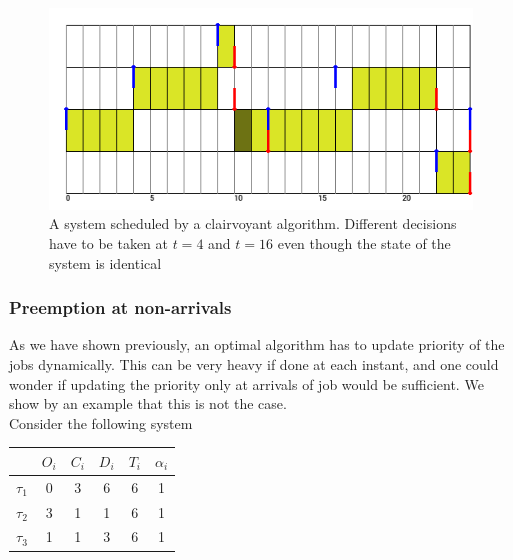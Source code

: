 \documentclass[a4paper,10pt]{article}
\begin{document}
        \begin{figure}[H]
        \begin{center}
            \includegraphics[scale=0.7]{figs/clairvoyance_example.png}
            \caption{A system scheduled by a clairvoyant algorithm. Different decisions have to be taken at $t=4$ and $t=16$ even though the state of the system is identical}
            \label{fig:clairvoyance}
        \end{center}
        \end{figure}


        \subsubsection{Preemption at non-arrivals}

        As we have shown previously, an optimal algorithm has to update priority of the jobs dynamically. This can be very heavy if done at each instant, and one could wonder if updating the priority only at arrivals of job would be sufficient. We show by an example that this is not the case.\\

        Consider the following system

        \begin{center}
            \begin{tabular}{|r|c|c|c|c|c|}
                \hline
                            & $O_i$ & $C_i$ & $D_i$ & $T_i$ & $\alpha_i$ \\ \hline
                $\tau_1$    & 0     & 3     & 6    & 6     & 1     \\ \hline
                $\tau_2$    & 3     & 1     & 1    & 6     & 1     \\ \hline
                $\tau_3$    & 1     & 1     & 3    & 6     & 1     \\ \hline
            \end{tabular}
        \end{center}
\end{document}
